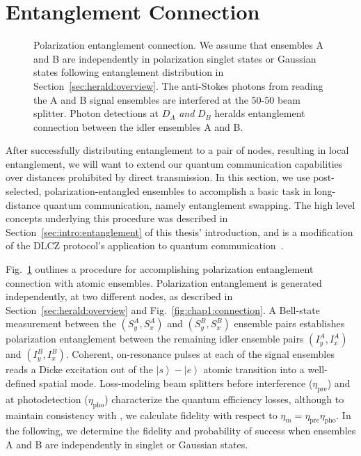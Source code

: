 \documentclass[aps,twocolumn,secnumarabic,amsmath,amssymb,pra,groupedaddress,
showpacs, showkeys]{revtex4-1}
\newcommand{\ket}[1]{\left|#1\right\rangle}
\newcommand{\pna}[1]{\left(#1\right)}
\begin{document}
\section{Entanglement Connection~\label{sec:herald:communication}}

\begin{figure}[htb]
	\centering
	\resizebox{5.00in}{!}{}
	\caption{Polarization entanglement connection. We assume that ensembles A and B are independently in polarization singlet states or Gaussian states following entanglement distribution in Section~\ref{sec:herald:overview}. The anti-Stokes photons from reading the A and B signal ensembles are interfered at the 50-50 beam splitter. Photon detections at $D_A$ \emph{and} $D_B$ heralds entanglement connection between the idler ensembles A and B.
	\label{fig:entanglement_connection}}
\end{figure}

After successfully distributing entanglement to a pair of nodes, resulting in
local entanglement, we will want to extend our quantum communication
capabilities over distances prohibited by direct transmission.  In this
section, we use post-selected, polarization-entangled ensembles to accomplish a
basic task in long-distance quantum communication, namely entanglement
swapping. The high level concepts underlying this procedure was described in
Section~\ref{sec:intro:entanglement} of this thesis' introduction, and
is a modification of the DLCZ protocol's application to quantum
communication~\cite{nature35106500}.

Fig.~\ref{fig:entanglement_connection} outlines a procedure for accomplishing
polarization entanglement connection with atomic ensembles. Polarization
entanglement is generated independently, at two different nodes, as described
in Section~\ref{sec:herald:overview} and Fig.~\ref{fig:chap1:connection}. A
Bell-state measurement between the $\pna{S_y^A,S_x^A}$ and $\pna{S_y^B,S_x^B}$
ensemble pairs establishes polarization entanglement between the remaining
idler ensemble pairs $\pna{I_y^A,I_x^A}$ and $\pna{I_y^B,I_x^B}$. Coherent,
on-resonance pulses at each of the signal ensembles reads a Dicke excitation
out of the $\ket{s}-\ket{e}$ atomic transition into a well-defined spatial
mode. Loss-modeling beam splitters before interference ($\eta_{\textrm{pre}}$)
and at photodetection ($\eta_{\textrm{pho}}$) characterize the quantum
efficiency losses, although to maintain consistency with
\cite{PhysRevA.73.042303}, we calculate fidelity with respect to
$\eta_{m}=\eta_{\textrm{pre}}\eta_{\textrm{pho}}$. In the
following, we determine the fidelity and probability of success when ensembles
A and B are independently in singlet or Gaussian states.
\end{document}
